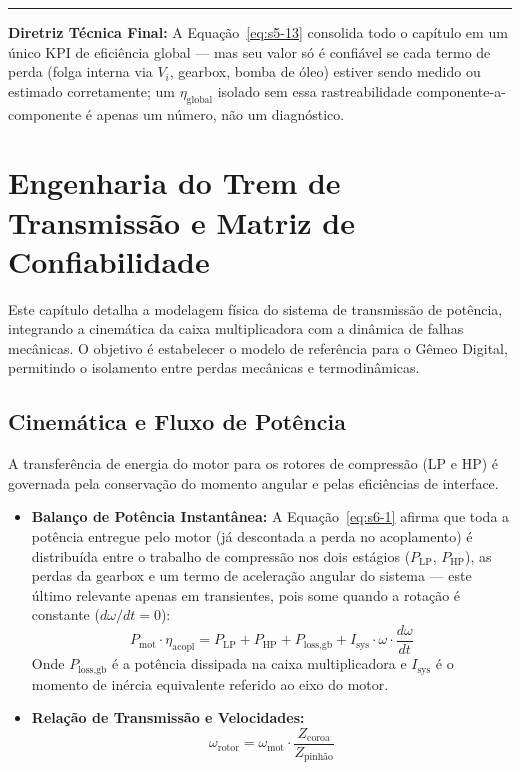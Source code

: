 \documentclass[12pt,a4paper]{article}
\numberwithin{equation}{section}
\numberwithin{table}{section}
\numberwithin{figure}{section}
\begin{document}
	\vspace{1em}
	\hrule
	\vspace{1em}

	\textbf{Diretriz Técnica Final:} A Equação~\eqref{eq:s5-13} consolida todo o capítulo em um único KPI de eficiência global — mas seu valor só é confiável se cada termo de perda (folga interna via $V_i$, gearbox, bomba de óleo) estiver sendo medido ou estimado corretamente; um $\eta_{\text{global}}$ isolado sem essa rastreabilidade componente-a-componente é apenas um número, não um diagnóstico.

	
	
	\section{\textbf{Engenharia do Trem de Transmissão e Matriz de Confiabilidade}}
	
	Este capítulo detalha a modelagem física do sistema de transmissão de potência, integrando a cinemática da caixa multiplicadora com a dinâmica de falhas mecânicas. O objetivo é estabelecer o modelo de referência para o Gêmeo Digital, permitindo o isolamento entre perdas mecânicas e termodinâmicas.
	
	\subsection{\textbf{Cinemática e Fluxo de Potência}}
	A transferência de energia do motor para os rotores de compressão (LP e HP) é governada pela conservação do momento angular e pelas eficiências de interface.
	\begin{itemize}
		\item \textbf{Balanço de Potência Instantânea:} A Equação~\eqref{eq:s6-1} afirma que toda a potência entregue pelo motor (já descontada a perda no acoplamento) é distribuída entre o trabalho de compressão nos dois estágios ($P_{\text{LP}}$, $P_{\text{HP}}$), as perdas da gearbox e um termo de aceleração angular do sistema — este último relevante apenas em transientes, pois some quando a rotação é constante ($d\omega/dt = 0$):
		\begin{equation}\label{eq:s6-1}
 P_{\text{mot}} \cdot \eta_{\text{acopl}} = P_{\text{LP}} + P_{\text{HP}} + P_{\text{loss,gb}} + I_{\text{sys}} \cdot \omega \cdot \frac{d\omega}{dt}
\end{equation}
		Onde $P_{\text{loss,gb}}$ é a potência dissipada na caixa multiplicadora e $I_{\text{sys}}$ é o momento de inércia equivalente referido ao eixo do motor.
		\item \textbf{Relação de Transmissão e Velocidades:}
		\begin{equation}\label{eq:s6-2}
 \omega_{\text{rotor}} = \omega_{\text{mot}} \cdot \frac{Z_{\text{coroa}}}{Z_{\text{pinhão}}} 
\end{equation}
	\end{itemize}
	
\end{document}
